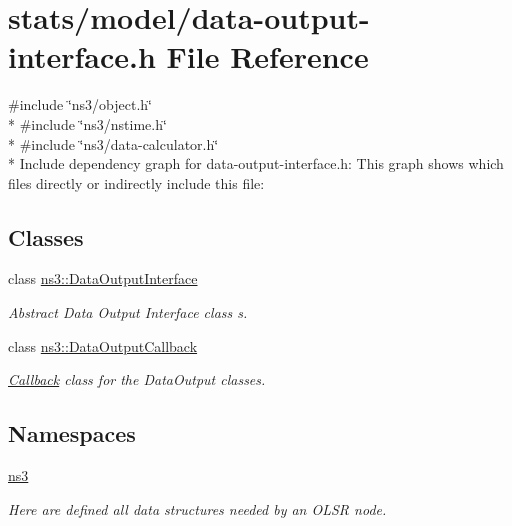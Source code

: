 \hypertarget{data-output-interface_8h}{}\section{stats/model/data-\/output-\/interface.h File Reference}
\label{data-output-interface_8h}
{\ttfamily \#include \char`\"{}ns3/object.\+h\char`\"{}}\\*
{\ttfamily \#include \char`\"{}ns3/nstime.\+h\char`\"{}}\\*
{\ttfamily \#include \char`\"{}ns3/data-\/calculator.\+h\char`\"{}}\\*
Include dependency graph for data-\/output-\/interface.h\+:
This graph shows which files directly or indirectly include this file\+:
\subsection*{Classes}
\begin{DoxyCompactItemize}
\item 
class \hyperlink{classns3_1_1DataOutputInterface}{ns3\+::\+Data\+Output\+Interface}
\begin{DoxyCompactList}\small\item\em Abstract Data Output Interface class s. \end{DoxyCompactList}\item 
class \hyperlink{classns3_1_1DataOutputCallback}{ns3\+::\+Data\+Output\+Callback}
\begin{DoxyCompactList}\small\item\em \hyperlink{classns3_1_1Callback}{Callback} class for the Data\+Output classes. \end{DoxyCompactList}\end{DoxyCompactItemize}
\subsection*{Namespaces}
\begin{DoxyCompactItemize}
\item 
 \hyperlink{namespacens3}{ns3}
\begin{DoxyCompactList}\small\item\em Here are defined all data structures needed by an O\+L\+SR node. \end{DoxyCompactList}\end{DoxyCompactItemize}

